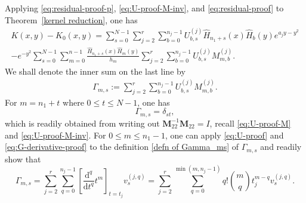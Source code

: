 \documentclass[a4paper,10pt,leqno]{amsart}
\numberwithin{equation}{section}
\theoremstyle{remark}
\newcommand{\dd}{\mathrm{d}}
\begin{document}
Applying \eqref{eq:residual-proof-p}, \eqref{eq:U-proof-M-inv}, and \eqref{eq:residual-proof} to Theorem~\ref{kernel reduction}, one has
\begin{multline}\label{eq:kernel-reduction-proof}
    K(x,y)-K_0(x,y) = \sum_{s=0}^{N-1}\sum_{j=2}^r\sum_{b=0}^{n_j-1}U^{(j)}_{b,s}\widehat H_{n_1+s}(x)\widehat H_b(y)e^{a_jy-y^2}\\
    -e^{-y^2}\sum_{s=0}^{N-1}\sum_{m=0}^{n-1}\frac{\widehat H_{n_1+s}(x)\widehat H_m(y)}{h_m}
    \sum_{j=2}^r\sum_{b=0}^{n_j-1}U^{(j)}_{b,s}M^{(j)}_{m,b}.
\end{multline}
We shall denote the inner sum on the last line by
\begin{align} \label{defn of Gamma_ms}
\Gamma_{m,s} := \sum_{j=2}^r\sum_{b=0}^{n_j-1}U^{(j)}_{b,s}M^{(j)}_{m,b}.
\end{align}
For $m=n_1+t$ where $0\leq t\leq N-1$, one has
\begin{equation}
\Gamma_{m,s} = \delta_{st}, \label{Gamma_ms 1}
\end{equation}
which is readily obtained from writing out $\bm M_{22}^{-1}\bm M_{22} = I$, recall \eqref{eq:U-proof-M} and \eqref{eq:U-proof-M-inv}. For $0\leq m\leq n_1-1$, one can apply \eqref{eq:U-proof} and \eqref{eq:G-derivative-proof} to the definition \eqref{defn of Gamma_ms} of $\Gamma_{m,s}$ and readily show that
\begin{equation}
    \Gamma_{m,s} = \sum_{j=2}^r\sum_{q=0}^{n_j-1}\left[\frac{\dd^q}{\dd t^q}t^m\right]_{t=t_j}v_s^{(j,q)} = \sum_{j=2}^r\sum_{q=0}^{\min(m,n_j-1)}q!\binom{m}{q}t_j^{m-q}v_s^{(j,q)}. \label{Gamma_ms 2}
\end{equation}
\end{document}
